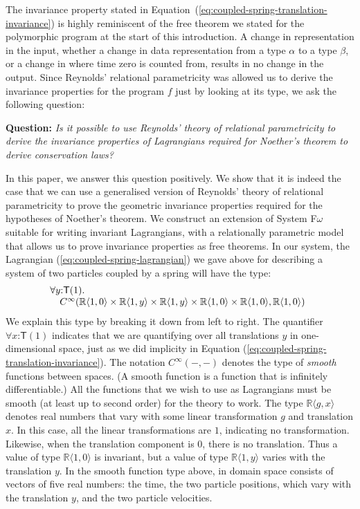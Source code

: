 \documentclass[preprint]{sigplanconf}
\theoremstyle{examplestyle}
\begin{document}
The invariance property stated in
Equation~(\ref{eq:coupled-spring-translation-invariance}) is highly
reminiscent of the free theorem we stated for the polymorphic program
at the start of this introduction. A change in representation in the
input, whether a change in data representation from a type $\alpha$ to
a type $\beta$, or a change in where time zero is counted from,
results in no change in the output. Since Reynolds' relational
parametricity was allowed us to derive the invariance properties for
the program $f$ just by looking at its type, we ask the following
question:

\medskip

\noindent
\textbf{Question:} \emph{Is it possible to use Reynolds' theory of
  relational parametricity to derive the invariance properties of
  Lagrangians required for Noether's theorem to derive conservation
  laws?}

\medskip

In this paper, we answer this question positively. We show that it is
indeed the case that we can use a generalised version of Reynolds'
theory of relational parametricity to prove the geometric invariance
properties required for the hypotheses of Noether's theorem. We
construct an extension of System F$\omega$ suitable for writing
invariant Lagrangians, with a relationally parametric model that
allows us to prove invariance properties as free theorems. In our
system, the Lagrangian (\ref{eq:coupled-spring-lagrangian}) we gave
above for describing a system of two particles coupled by a spring
will have the type:
\begin{displaymath}
  \begin{array}{@{}l}
  \forall y \mathord: \mathsf{T}(1).\\
  \quad C^\infty(\mathbb{R}\langle 1, 0 \rangle \times \mathbb{R}\langle 1, y \rangle \times \mathbb{R}\langle 1, y \rangle \times \mathbb{R}\langle 1, 0 \rangle \times \mathbb{R}\langle 1, 0 \rangle, \mathbb{R}\langle 1, 0 \rangle)
\end{array}
\end{displaymath}
We explain this type by breaking it down from left to right. The
quantifier $\forall x \mathord: \mathsf{T}(1)$ indicates that we are
quantifying over all translations $y$ in one-dimensional space, just
as we did implicity in Equation
(\ref{eq:coupled-spring-translation-invariance}). The notation
$C^\infty(-,-)$ denotes the type of \emph{smooth} functions between
spaces. (A smooth function is a function that is infinitely
differentiable.) All the functions that we wish to use as Lagrangians
must be smooth (at least up to second order) for the theory to
work. The type $\mathbb{R}\langle g, x \rangle$ denotes real numbers
that vary with some linear transformation $g$ and translation $x$. In
this case, all the linear transformations are $1$, indicating no
transformation. Likewise, when the translation component is $0$, there
is no translation. Thus a value of type $\mathbb{R}\langle 1, 0
\rangle$ is invariant, but a value of type $\mathbb{R}\langle 1, y
\rangle$ varies with the translation $y$. In the smooth function type
above, in domain space consists of vectors of five real numbers: the
time, the two particle positions, which vary with the translation $y$,
and the two particle velocities.
\end{document}
